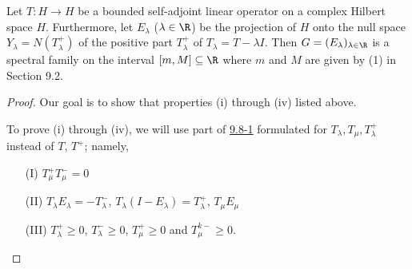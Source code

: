 \begin{theorem}\label{9.8-3}
    Let \( T : H \to H  \) be a bounded self-adjoint linear operator on a complex Hilbert space \( H  \). Furthermore, let \( {E}_{\lambda}  \) (\( \lambda \in \R  \)) be the projection of \( H  \) onto the null space \( {Y}_{\lambda } = N({T}_{\lambda}^{+}) \) of the positive part \( {T}_{\lambda}^{+}  \) of \( {T}_{\lambda} = T - \lambda I  \). Then \( G = ({E}_{\lambda})_{\lambda \in \R }\) is a spectral family on the interval \( [m,M ] \subseteq \R  \) where \( m  \) and \( M  \) are given by (1) in Section 9.2.
\end{theorem}
\begin{proof}
Our goal is to show that properties (i) through (iv) listed above.

To prove (i) through (iv), we will use part of {\hyperref[9.8-1]{9.8-1}} formulated for \( {T}_{\lambda}, {T}_{\mu} , {T}_{\lambda}^{+} \) instead of \( T  \), \( T^{+} \); namely,  
\begin{enumerate}
    \item[(I)] \( {T}_{\mu }^{+} {T}_{\mu }^{-} = 0  \)
    \item[(II)] \( {T}_{\lambda} {E}_{\lambda} = - {T}_{\lambda}^{-}  \), \( {T}_{\lambda} (I - {E}_{\lambda}) = {T}_{\lambda}^{+} \), \( {T}_{\mu } {E}_{\mu} \)
    \item[(III)] \( {T}_{\lambda}^{+} \geq 0  \), \( {T}_{\lambda}^{-} \geq 0  \), \( {T}_{\mu }^{+} \geq 0  \) and \( {T}_{\mu }^{k-} \geq 0  \).
\end{enumerate}


\end{proof}
